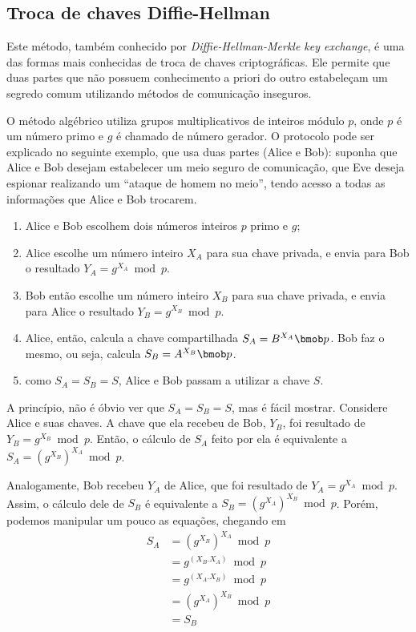 
\subsection*{Troca de chaves Diffie-Hellman}

Este método, também conhecido por \emph{Diffie-Hellman-Merkle key exchange}, é uma das
formas mais conhecidas de troca de chaves criptográficas. Ele permite que duas partes
que não possuem conhecimento a priori do outro estabeleçam um segredo comum utilizando
métodos de comunicação inseguros.

O método algébrico utiliza grupos multiplicativos de inteiros módulo $p$, onde $p$ é um
número primo e $g$ é chamado de número gerador. O protocolo pode ser explicado no
seguinte exemplo, que usa duas partes (Alice e Bob): suponha que Alice e Bob desejam
estabelecer um meio seguro de comunicação, que Eve deseja espionar realizando um
``ataque de homem no meio'', tendo acesso a todas as informações que Alice e Bob
trocarem.

\begin{enumerate}
    \item Alice e Bob escolhem dois números inteiros $p$ primo e $g$;

    \item Alice escolhe um número inteiro $X_{A}$ para sua chave privada, e envia para
        Bob o resultado $Y_{A} = g^{X_{A}} \bmod p$.

    \item Bob então escolhe um número inteiro $X_{B}$ para sua chave privada, e envia
        para Alice o resultado $Y_{B} = g^{X_{B}} \bmod p$.

    \item Alice, então, calcula a chave compartilhada $S_A = B^{X_{A}} \bmob p$. Bob faz
        o mesmo, ou seja, calcula $S_B = A^{X_{B}} \bmob p$.

    \item como $S_A = S_B = S$, Alice e Bob passam a utilizar a chave $S$.
\end{enumerate}

A princípio, não é óbvio ver que $S_A = S_B = S$, mas é fácil mostrar. Considere Alice e
suas chaves. A chave que ela recebeu de Bob, $Y_{B}$, foi resultado de
$Y_{B} = g^{X_{B}} \bmod p$. Então, o cálculo de $S_A$ feito por ela é equivalente a
$S_A = (g^{X_{B}})^{X_{A}} \bmod p$.

Analogamente, Bob recebeu $Y_{A}$ de Alice, que foi resultado de
$Y_{A} = g^{X_{A}} \bmod p$. Assim, o cálculo dele de $S_B$ é equivalente a
$S_B = (g^{X_{A}})^{X_{B}} \bmod p$. Porém, podemos manipular um pouco as equações,
chegando em
\begin{align*}
S_A & = (g^{X_{B}})^{X_{A}} \bmod p \\
    & = g^{(X_{B}.X_{A})}   \bmod p \\
    & = g^{(X_{A}.X_{B})}   \bmod p \\
    & = (g^{X_{A}})^{X_{B}} \bmod p \\
    & = S_B
\end{align*}

